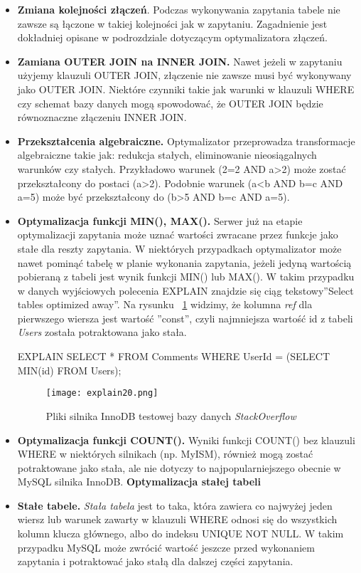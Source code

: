 \begin{itemize}
	\item \textbf{Zmiana kolejności złączeń}. Podczas wykonywania zapytania tabele nie zawsze są łączone w takiej kolejności jak w zapytaniu. Zagadnienie jest dokładniej opisane w podrozdziale dotyczącym optymalizatora złączeń.
	\item \textbf{Zamiana OUTER JOIN na INNER JOIN.} Nawet jeżeli w zapytaniu użyjemy klauzuli OUTER JOIN, złączenie nie zawsze musi być wykonywany jako OUTER JOIN. Niektóre czynniki takie jak warunki w klauzuli WHERE czy schemat bazy danych mogą spowodować, że OUTER JOIN będzie równoznaczne złączeniu INNER JOIN. 
	\item \textbf{Przekształcenia algebraiczne.} Optymalizator przeprowadza transformacje algebraiczne takie jak: redukcja stałych, eliminowanie nieosiągalnych warunków czy stałych. Przykładowo warunek (2=2 AND a>2) może zostać przekształcony do postaci (a>2). Podobnie warunek (a<b AND b=c AND a=5) może być przekształcony do (b>5 AND b=c AND a=5).
	\item \textbf{Optymalizacja funkcji MIN(), MAX().}
	Serwer już na etapie optymalizacji zapytania może uznać wartości zwracane przez funkcje jako stałe dla reszty zapytania. W niektórych przypadkach optymalizator może nawet pominąć tabelę w planie wykonania zapytania, jeżeli jedyną wartością pobieraną z tabeli jest wynik funkcji MIN() lub MAX(). W takim przypadku w danych wyjściowych polecenia EXPLAIN znajdzie się ciąg tekstowy''Select tables optimized away''.
	Na rysunku ~\ref{fig:explain20} widzimy, że kolumna \textit{ref} dla pierwszego wiersza jest wartość ''const'', czyli najmniejsza wartość id z tabeli \textit{Users} została potraktowana jako stała.
	\begin{spverbatim}
		EXPLAIN SELECT * FROM Comments WHERE UserId = (SELECT MIN(id) FROM Users);
	\end{spverbatim}
\begin{figure}
	\caption{Pliki silnika InnoDB testowej bazy danych \textit{StackOverflow}}
	\centering
	\texttt{[image: explain20.png]}
	\label{fig:explain20}
\end{figure}
	\item \textbf{Optymalizacja funkcji COUNT().} Wyniki funkcji COUNT() bez klauzuli WHERE w niektórych silnikach (np. MyISM), również mogą zostać potraktowane jako stała, ale nie dotyczy to najpopularniejszego obecnie w MySQL silnika InnoDB.
	\textbf{Optymalizacja stałej tabeli}
	
	\item \textbf{Stałe tabele.} \textit{Stała tabela} jest to taka, która zawiera co najwyżej jeden wiersz lub warunek zawarty w klauzuli WHERE odnosi się do wszystkich kolumn klucza głównego, albo do indeksu UNIQUE NOT NULL. W takim przypadku MySQL może zwrócić wartość jeszcze przed wykonaniem zapytania i potraktować jako stałą dla dalszej części zapytania.
\end{itemize}

